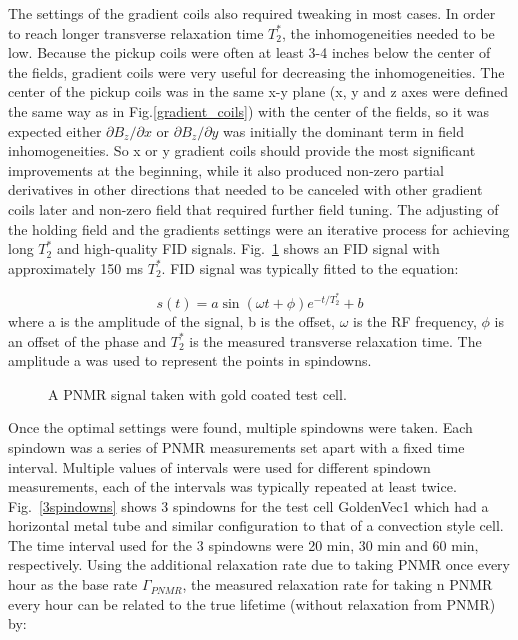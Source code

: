 The settings of the gradient coils also required tweaking in most cases. In order to reach longer transverse relaxation time $T_2^*$, the inhomogeneities needed to be low. Because the pickup coils were often at least 3-4 inches below the center of the fields, gradient coils were very useful for decreasing the inhomogeneities. The center of the pickup coils was in the same x-y plane (x, y and z axes were defined the same way as in Fig.\ref{gradient_coils}) with the center of the fields, so it was expected either $\partial B_z/\partial x$ or $\partial B_z/\partial y$ was initially the dominant term in field inhomogeneities. So x or y gradient coils should provide the most significant improvements at the beginning, while it also produced non-zero partial derivatives in other directions that needed to be canceled with other gradient coils later and non-zero field that required further field tuning. The adjusting of the holding field and the gradients settings were an iterative process for achieving long $T_2^*$ and high-quality FID signals. Fig.~\ref{FID} shows an FID signal with approximately 150 ms $T_2^*$. FID signal was typically fitted to the equation:

\begin{equation}
s(t)=a\sin(\omega t+\phi)e^{-t/T_{2}^{*}}+b
\end{equation}
where a is the amplitude of the signal, b is the offset, $\omega$ is the RF frequency, $\phi$ is an offset of the phase and $T_{2}^{*}$ is the measured transverse relaxation time. The amplitude a was used to represent the points in spindowns.

\begin{figure}[H]
	\centering
	\caption{{ A PNMR signal taken with gold coated test cell.}}
	\label{FID}
\end{figure}

Once the optimal settings were found, multiple spindowns were taken. Each spindown was a series of PNMR measurements set apart with a fixed time interval. Multiple values of intervals were used for different spindown measurements, each of the intervals was typically repeated at least twice. Fig.~\ref{3spindowns} shows 3 spindowns for the test cell GoldenVec1 which had a horizontal metal tube and similar configuration to that of a convection style cell. The time interval used for the 3 spindowns were 20 min, 30 min and 60 min, respectively. Using the additional relaxation rate due to taking PNMR once every hour as the base rate $\Gamma_{PNMR}$, the measured relaxation rate for taking n PNMR every hour can be related to the true lifetime (without relaxation from PNMR) by:

